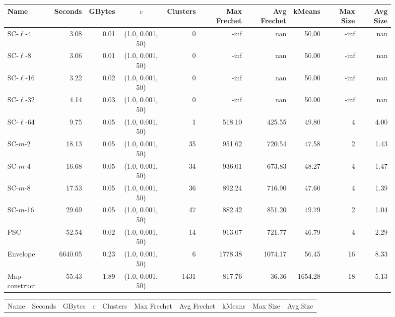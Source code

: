 \clearpage
\newpage 
%
\clearpage
\begin{figure} \begin{center}
    \begin{minipage}{\textwidth}
    {
    \begin{tabular}{@{}lrrcrrrrrr@{}}
        \toprule
        Name & Seconds & GBytes & $c$ & Clusters & Max Frechet & Avg Frechet & kMeans & Max Size & Avg Size\\
        \midrule
        SC-$\ell$-4 & 3.08 & 0.01 & (1.0, 0.001, 50) & 0 & -inf & nan & 50.00 & -inf & nan\\
        SC-$\ell$-8 & 3.06 & 0.01 & (1.0, 0.001, 50) & 0 & -inf & nan & 50.00 & -inf & nan\\
        SC-$\ell$-16 & 3.22 & 0.02 & (1.0, 0.001, 50) & 0 & -inf & nan & 50.00 & -inf & nan\\
        SC-$\ell$-32 & 4.14 & 0.03 & (1.0, 0.001, 50) & 0 & -inf & nan & 50.00 & -inf & nan\\
        SC-$\ell$-64 & 9.75 & 0.05 & (1.0, 0.001, 50) & 1 & 518.10 & 425.55 & 49.80 & 4 & 4.00\\
        SC-$m$-2 & 18.13 & 0.05 & (1.0, 0.001, 50) & 35 & 951.62 & 720.54 & 47.58 & 2 & 1.43\\
        SC-$m$-4 & 16.68 & 0.05 & (1.0, 0.001, 50) & 34 & 936.01 & 673.83 & 48.27 & 4 & 1.47\\
        SC-$m$-8 & 17.53 & 0.05 & (1.0, 0.001, 50) & 36 & 892.24 & 716.90 & 47.60 & 4 & 1.39\\
        SC-$m$-16 & 29.69 & 0.05 & (1.0, 0.001, 50) & 47 & 882.42 & 851.20 & 49.79 & 2 & 1.04\\
        PSC & 52.54 & 0.02 & (1.0, 0.001, 50) & 14 & 913.07 & 721.77 & 46.79 & 4 & 2.29\\
        Envelope & 6640.05 & 0.23 & (1.0, 0.001, 50) & 6 & 1778.38 & 1074.17 & 56.45 & 16 & 8.33\\
        Map-construct & 55.43 & 1.89 & (1.0, 0.001, 50) & 1431 & 817.76 & 36.36 & 1654.28 & 18 & 5.13\\
        \bottomrule
    \end{tabular}
    }
    {
    \begin{tabular}{@{}lrrcrrrrrr@{}}
        \toprule
        Name & Seconds & GBytes & $c$ & Clusters & Max Frechet & Avg Frechet & kMeans & Max Size & Avg Size\\

\end{tabular}}
\end{minipage}
\end{center}
\end{figure}
